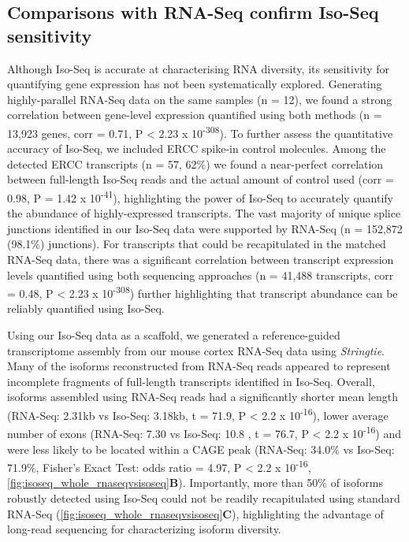 	
\newpage
\subsection{Comparisons with RNA-Seq confirm Iso-Seq sensitivity} 
\label{sec: whole_isoseqvsrnaseq}
Although Iso-Seq is accurate at characterising RNA diversity\cite{Wang2019}, its sensitivity for quantifying gene expression has not been systematically explored. Generating highly-parallel RNA-Seq data on the same samples (n = 12), we found a strong correlation between gene-level expression quantified using both methods (n = 13,923 genes, corr = 0.71, P < 2.23 x 10\textsuperscript{-308}). To further assess the quantitative accuracy of Iso-Seq, we included ERCC spike-in control molecules. Among the detected ERCC transcripts (n = 57, 62\%) we found a near-perfect correlation between full-length Iso-Seq reads and the actual amount of control used (corr = 0.98, P = 1.42 x 10\textsuperscript{-41}), highlighting the power of Iso-Seq to accurately quantify the abundance of highly-expressed transcripts. The vast majority of unique splice junctions identified in our Iso-Seq data were supported by RNA-Seq (n = 152,872 (98.1\%) junctions). For transcripts that could be recapitulated in the matched RNA-Seq data, there was a significant correlation between transcript expression levels quantified using both sequencing approaches (n = 41,488 transcripts, corr = 0.48, P < 2.23 x 10\textsuperscript{-308}) further highlighting that transcript abundance can be reliably quantified using Iso-Seq. 

Using our Iso-Seq data as a scaffold, we generated a reference-guided transcriptome assembly from our mouse cortex RNA-Seq data using \textit{Stringtie}\cite{Pertea2015}. Many of the isoforms reconstructed from RNA-Seq reads appeared to represent incomplete fragments of full-length transcripts identified in Iso-Seq. Overall, isoforms assembled using RNA-Seq reads had a significantly shorter mean length (RNA-Seq: 2.31kb vs Iso-Seq: 3.18kb, t = 71.9, P < 2.2 x 10\textsuperscript{-16}), lower average number of exons (RNA-Seq: 7.30 vs Iso-Seq: 10.8 , t = 76.7, P < 2.2 x 10\textsuperscript{-16}) and were less likely to be located within a CAGE peak (RNA-Seq: 34.0\% vs Iso-Seq: 71.9\%, Fisher’s Exact Test: odds ratio = 4.97, P < 2.2 x 10\textsuperscript{-16}, \cref{fig:isoseq_whole_rnaseqvsisoseq}\textbf{B}). Importantly, more than 50\% of isoforms robustly detected using Iso-Seq could not be readily recapitulated using standard RNA-Seq (\cref{fig:isoseq_whole_rnaseqvsisoseq}\textbf{C}), highlighting the advantage of long-read sequencing for characterizing isoform diversity.%

